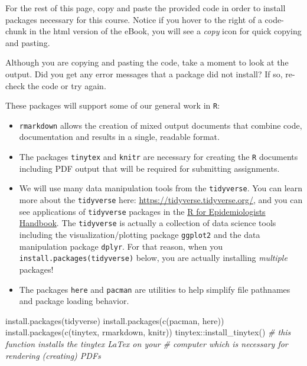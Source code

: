 \documentclass[
]{book}
\newenvironment{Shaded}{\begin{snugshade}}{\end{snugshade}}
\newcommand{\CommentTok}[1]{\textcolor[rgb]{0.56,0.35,0.01}{\textit{#1}}}
\newcommand{\FunctionTok}[1]{\textcolor[rgb]{0.00,0.00,0.00}{#1}}
\newcommand{\NormalTok}[1]{#1}
\newcommand{\SpecialCharTok}[1]{\textcolor[rgb]{0.00,0.00,0.00}{#1}}
\newcommand{\StringTok}[1]{\textcolor[rgb]{0.31,0.60,0.02}{#1}}
\providecommand{\tightlist}{%
  \setlength{\itemsep}{0pt}\setlength{\parskip}{0pt}}
\newenvironment{rmdtip}[1]
  {
  \begin{itemize}
  \renewcommand{\labelitemi}{
    \raisebox{-.7\height}[0pt][0pt]{
      {\setkeys{Gin}{width=3em,keepaspectratio}\texttt{[image: images/\#1]}}
    }
  }
  \setlength{\fboxsep}{1em}
  \begin{tip}
  \item
  }
  {
  \end{tip}
  \end{itemize}
  }
\begin{document}
For the rest of this page, copy and paste the provided code in order to install packages necessary for this course. Notice if you hover to the right of a code-chunk in the html version of the eBook, you will see a \emph{copy} icon for quick copying and pasting.

\begin{rmdtip}{tip}
Although you are copying and pasting the code, take a moment to look at the output. Did you get any error messages that a package did not install? If so, re-check the code or try again.

\end{rmdtip}

These packages will support some of our general work in \texttt{R}:

\begin{itemize}
\tightlist
\item
  \texttt{rmarkdown} allows the creation of mixed output documents that combine code, documentation and results in a single, readable format.
\item
  The packages \texttt{tinytex} and \texttt{knitr} are necessary for creating the \texttt{R} documents including PDF output that will be required for submitting assignments.
\item
  We will use many data manipulation tools from the \texttt{tidyverse}. You can learn more about the \texttt{tidyverse} here: \url{https://tidyverse.tidyverse.org/}, and you can see applications of \texttt{tidyverse} packages in the \href{https://epirhandbook.com/index.html}{R for Epidemiologists Handbook}. The \texttt{tidyverse} is actually a collection of data science tools including the visualization/plotting package \texttt{ggplot2} and the data manipulation package \texttt{dplyr}. For that reason, when you \texttt{install.packages(\textquotesingle{}tidyverse\textquotesingle{})} below, you are actually installing \emph{multiple} packages!\\
\item
  The packages \texttt{here} and \texttt{pacman} are utilities to help simplify file pathnames and package loading behavior.
\end{itemize}

\begin{Shaded}
\begin{Highlighting}[]
\FunctionTok{install.packages}\NormalTok{(}\StringTok{\textquotesingle{}tidyverse\textquotesingle{}}\NormalTok{)   }
\FunctionTok{install.packages}\NormalTok{(}\FunctionTok{c}\NormalTok{(}\StringTok{\textquotesingle{}pacman\textquotesingle{}}\NormalTok{, }\StringTok{\textquotesingle{}here\textquotesingle{}}\NormalTok{))}
\FunctionTok{install.packages}\NormalTok{(}\FunctionTok{c}\NormalTok{(}\StringTok{\textquotesingle{}tinytex\textquotesingle{}}\NormalTok{, }\StringTok{\textquotesingle{}rmarkdown\textquotesingle{}}\NormalTok{, }\StringTok{\textquotesingle{}knitr\textquotesingle{}}\NormalTok{)) }
\NormalTok{tinytex}\SpecialCharTok{::}\FunctionTok{install\_tinytex}\NormalTok{()  }
\CommentTok{\# this function installs the tinytex LaTex on your}
\CommentTok{\#  computer which is necessary for rendering (creating) PDF\textquotesingle{}s }
\end{Highlighting}
\end{Shaded}
\end{document}
